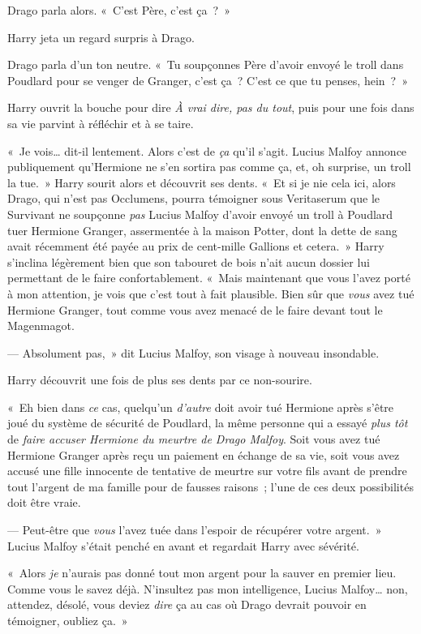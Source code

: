 Drago parla alors.
«~C'est Père, c'est ça~?~»

Harry jeta un regard surpris à Drago.

Drago parla d'un ton neutre.
«~Tu soupçonnes Père d'avoir envoyé le troll dans Poudlard pour se venger de Granger, c'est ça~?
C'est ce que tu penses, hein~?~»

Harry ouvrit la bouche pour dire \emph{À vrai dire, pas du tout}, puis pour une fois dans sa vie parvint à réfléchir et à se taire.

«~Je vois… dit-il lentement.
Alors c'est de \emph{ça} qu'il s'agit.
Lucius Malfoy annonce publiquement qu'Hermione ne s'en sortira pas comme ça, et, oh surprise, un troll la tue.~»
Harry sourit alors et découvrit ses dents.
«~Et si je nie cela ici, alors Drago, qui n'est pas Occlumens, pourra témoigner sous Veritaserum que le Survivant ne soupçonne \emph{pas} Lucius Malfoy d'avoir envoyé un troll à Poudlard tuer Hermione Granger, assermentée à la maison Potter, dont la dette de sang avait récemment été payée au prix de cent-mille Gallions et cetera.~»
Harry s'inclina légèrement bien que son tabouret de bois n'ait aucun dossier lui permettant de le faire confortablement.
«~Mais maintenant que vous l'avez porté à mon attention, je vois que c'est tout à fait plausible.
Bien sûr que \emph{vous} avez tué Hermione Granger, tout comme vous avez menacé de le faire devant tout le Magenmagot.

--- Absolument pas,~» dit Lucius Malfoy, son visage à nouveau insondable.

Harry découvrit une fois de plus ses dents par ce non-sourire.

«~Eh bien dans \emph{ce} cas, quelqu'un \emph{d'autre} doit avoir tué Hermione après s'être joué du système de sécurité de Poudlard, la même personne qui a essayé \emph{plus tôt} de \emph{faire accuser Hermione du meurtre de Drago Malfoy}.
Soit vous avez tué Hermione Granger après reçu un paiement en échange de sa vie, soit vous avez accusé une fille innocente de tentative de meurtre sur votre fils avant de prendre tout l'argent de ma famille pour de fausses raisons~; l'une de ces deux possibilités doit être vraie.

--- Peut-être que \emph{vous} l'avez tuée dans l'espoir de récupérer votre argent.~»
Lucius Malfoy s'était penché en avant et regardait Harry avec sévérité.

«~Alors \emph{je} n'aurais pas donné tout mon argent pour la sauver en premier lieu.
Comme vous le savez déjà.
N'insultez pas mon intelligence, Lucius Malfoy… non, attendez, désolé, vous deviez \emph{dire} ça au cas où Drago devrait pouvoir en témoigner, oubliez ça.~»

